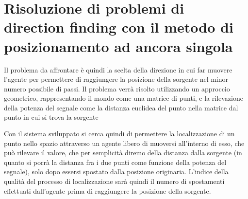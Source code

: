 \section{Risoluzione di problemi di direction finding con il metodo di posizionamento ad ancora singola}
Il problema da affrontare è quindi la scelta della direzione in cui far muovere l'agente per permettere di raggiungere la posizione della sorgente nel minor numero possibile di passi. 
Il problema verrà risolto utilizzando un approccio geometrico, rappresentando il mondo come una matrice di punti, e la rilevazione della potenza del segnale come la distanza euclidea del punto nella matrice dal punto in cui si trova la sorgente

Con il sistema sviluppato si cerca quindi di permettere la localizzazione di un punto nello spazio attraverso un agente libero di muoversi all'interno di esso, che può rilevare il valore, che per semplicità diremo della distanza dalla sorgente (in quanto si porrà la distanza fra i due punti come funzione della potenza del segnale), solo dopo essersi spostato dalla posizione originaria. L'indice della qualità del processo di localizzazione sarà quindi il numero di spostamenti effettuati dall'agente prima di raggiungere la posizione della sorgente.